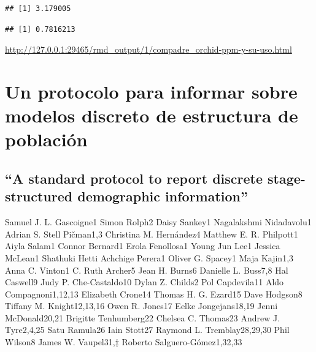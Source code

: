 \documentclass[
]{book}
\newenvironment{Shaded}{\begin{snugshade}}{\end{snugshade}}
\newcommand{\AttributeTok}[1]{\textcolor[rgb]{0.13,0.29,0.53}{#1}}
\newcommand{\ConstantTok}[1]{\textcolor[rgb]{0.56,0.35,0.01}{#1}}
\newcommand{\DecValTok}[1]{\textcolor[rgb]{0.00,0.00,0.81}{#1}}
\newcommand{\FunctionTok}[1]{\textcolor[rgb]{0.13,0.29,0.53}{\textbf{#1}}}
\newcommand{\NormalTok}[1]{#1}
\newcommand{\SpecialCharTok}[1]{\textcolor[rgb]{0.81,0.36,0.00}{\textbf{#1}}}
\theoremstyle{definition}
\theoremstyle{definition}
\theoremstyle{definition}
\theoremstyle{definition}
\theoremstyle{remark}
\begin{document}
\begin{Shaded}
\end{Shaded}

\begin{verbatim}
## [1] 3.179005
\end{verbatim}

\begin{Shaded}
\end{Shaded}

\begin{verbatim}
## [1] 0.7816213
\end{verbatim}

\url{http://127.0.0.1:29465/rmd_output/1/compadre_orchid-ppm-y-su-uso.html}

\chapter{Un protocolo para informar sobre modelos discreto de estructura de población}\label{un-protocolo-para-informar-sobre-modelos-discreto-de-estructura-de-poblaciuxf3n}

\section{``A standard protocol to report discrete stage-structured demographic information''}\label{a-standard-protocol-to-report-discrete-stage-structured-demographic-information}

Samuel J. L. Gascoigne1 \textbar{} Simon Rolph2 \textbar{} Daisy Sankey1 \textbar{} Nagalakshmi Nidadavolu1 \textbar{} Adrian S. Stell Pičman1,3 \textbar{} Christina M. Hernández4 \textbar{} Matthew E. R. Philpott1 \textbar{} Aiyla Salam1 \textbar{} Connor Bernard1 \textbar{} Erola Fenollosa1 \textbar{} Young Jun Lee1 \textbar{} Jessica McLean1 \textbar{} Shathuki Hetti Achchige Perera1 \textbar{} Oliver G. Spacey1 \textbar{} Maja Kajin1,3 \textbar{} Anna C. Vinton1 \textbar{} C. Ruth Archer5 \textbar{} Jean H. Burns6 \textbar{} Danielle L. Buss7,8 \textbar{} Hal Caswell9 \textbar{} Judy P. Che-Castaldo10 \textbar{} Dylan Z. Childs2 \textbar{} Pol Capdevila11 \textbar{} Aldo Compagnoni1,12,13 \textbar{} Elizabeth Crone14 \textbar{} Thomas H. G. Ezard15 \textbar{} Dave Hodgson8 \textbar{} Tiffany M. Knight12,13,16 \textbar{} Owen R. Jones17 \textbar{} Eelke Jongejans18,19 \textbar{} Jenni McDonald20,21 \textbar{} Brigitte Tenhumberg22 \textbar{} Chelsea C. Thomas23 \textbar{} Andrew J. Tyre2,4,25 \textbar{} Satu Ramula26 \textbar{} Iain Stott27 \textbar{} Raymond L. Tremblay28,29,30 \textbar{} Phil Wilson8 \textbar{} James W. Vaupel31,‡ \textbar{} Roberto Salguero-Gómez1,32,33
\end{document}
